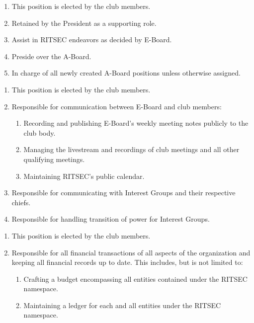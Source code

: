 
\begin{enumerate}
	\item This position is elected by the club members.
	\item Retained by the President as a supporting role.
	\item Assist in RITSEC endeavors as decided by E-Board.
	\item Preside over the A-Board.
	\item In charge of all newly created A-Board positions unless otherwise assigned.
\end{enumerate}


\begin{enumerate}
	\item This position is elected by the club members.
	\item Responsible for communication between E-Board and club members:
	      \begin{enumerate}
		      \item Recording and publishing E-Board's weekly meeting notes publicly to the club
		            body.
		      \item Managing the livestream and recordings of club meetings and all other
		            qualifying meetings.
		      \item Maintaining RITSEC's public calendar.
	      \end{enumerate}
	\item Responsible for communicating with Interest Groups and their
	      respective chiefs.
	\item Responsible for handling transition of power for Interest Groups.
\end{enumerate}


\begin{enumerate}
	\item This position is elected by the club members.
	\item Responsible for all financial transactions of all aspects of the organization
	      and keeping all financial records up to date. This includes, but is not limited
	      to:
	      \begin{enumerate}
		      \item Crafting a budget encompassing all entities contained under the RITSEC
		            namespace.
		      \item Maintaining a ledger for each and all entities under the RITSEC namespace.
	      \end{enumerate}
\end{enumerate}


